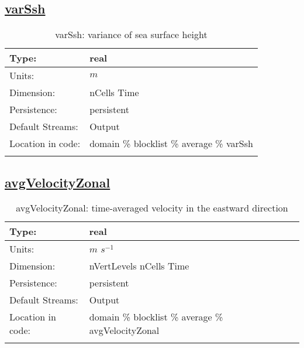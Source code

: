 \subsection[varSsh]{\hyperref[sec:var_tab_average]{varSsh}}
\label{subsec:var_sec_average_varSsh}
\begin{center}
\begin{longtable}{| p{2.0in} | p{4.0in} |}
        \hline 
        Type: & real \\
        \hline 
        Units: & $m$ \\
        \hline 
        Dimension: & nCells Time \\
        \hline 
        Persistence: & persistent \\
        \hline 
		 Default Streams: & Output  \\
        \hline 
		 Location in code: & domain \% blocklist \% average \% varSsh \\
		 \hline 
    \caption{varSsh: variance of sea surface height}
\end{longtable}
\end{center}
\subsection[avgVelocityZonal]{\hyperref[sec:var_tab_average]{avgVelocityZonal}}
\label{subsec:var_sec_average_avgVelocityZonal}
\begin{center}
\begin{longtable}{| p{2.0in} | p{4.0in} |}
        \hline 
        Type: & real \\
        \hline 
        Units: & $m$ $s^{-1}$ \\
        \hline 
        Dimension: & nVertLevels nCells Time \\
        \hline 
        Persistence: & persistent \\
        \hline 
		 Default Streams: & Output  \\
        \hline 
		 Location in code: & domain \% blocklist \% average \% avgVelocityZonal \\
		 \hline 
    \caption{avgVelocityZonal: time-averaged velocity in the eastward direction}
\end{longtable}
\end{center}
